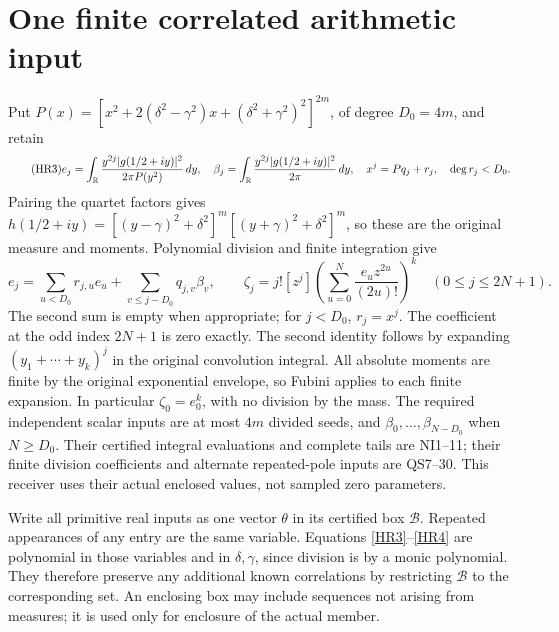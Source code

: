 \documentclass[11pt]{article}
\begin{document}
\section{One finite correlated arithmetic input}

Put \(P(x)=[x^2+2(\delta^2-\gamma^2)x+
(\delta^2+\gamma^2)^2]^{2m}\), of degree \(D_0=4m\), and retain
\begin{equation}\tag{HR3}\label{HR3}
e_j=\int_\mathbb R \frac{y^{2j}|g(1/2+iy)|^2}{2\pi P(y^2)}\,dy,
\quad \beta_j=\int_\mathbb R \frac{y^{2j}|g(1/2+iy)|^2}{2\pi}\,dy,
\quad x^j=Pq_j+r_j,\quad\deg r_j<D_0.
\end{equation}
Pairing the quartet factors gives \(h(1/2+iy)=
[(y-\gamma)^2+\delta^2]^m[(y+\gamma)^2+\delta^2]^m\), so these
are the original measure and moments. Polynomial division and finite
integration give
\begin{equation}\tag{HR4}\label{HR4}
e_j=\sum_{u<D_0}r_{j,u}e_u+\sum_{v\le j-D_0}q_{j,v}\beta_v,
\qquad
\zeta_j=j![z^j]\left(\sum_{u=0}^N\frac{e_u z^{2u}}{(2u)!}\right)^k
\quad(0\le j\le2N+1).
\end{equation}
The second sum is empty when appropriate; for \(j<D_0\), \(r_j=x^j\).
The coefficient at the odd index \(2N+1\) is zero exactly. The second
identity follows by expanding \((y_1+\cdots+y_k)^j\) in the original
convolution integral. All absolute moments are finite by the original
exponential envelope, so Fubini applies to each finite expansion.
In particular \(\zeta_0=e_0^k\), with no division by the mass.
The required independent scalar inputs are at most \(4m\) divided
seeds, and \(\beta_0,\ldots,\beta_{N-D_0}\) when \(N\ge D_0\).
Their certified integral evaluations and complete tails are NI1--11;
their finite division coefficients and alternate repeated-pole inputs
are QS7--30. This receiver uses their actual enclosed values, not
sampled zero parameters.

Write all primitive real inputs as one vector \(\theta\) in its
certified box \(\mathcal B\). Repeated appearances of any entry are
the same variable. Equations \eqref{HR3}--\eqref{HR4} are polynomial
in those variables and in \(\delta,\gamma\), since division is by a
monic polynomial. They therefore preserve any additional known
correlations by restricting \(\mathcal B\) to the corresponding set.
An enclosing box may include sequences not arising from measures;
it is used only for enclosure of the actual member.
\end{document}
